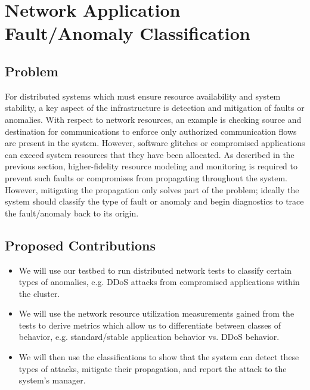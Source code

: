 \section{Network Application Fault/Anomaly Classification}
\label{sec:classification}

\subsection{Problem}
For distributed systems which must ensure resource availability and
system stability, a key aspect of the infrastructure is detection and
mitigation of faults or anomalies.  With respect to network resources,
an example is checking source and destination for communications to
enforce only authorized communication flows are present in the system.
However, software glitches or compromised applications can exceed
system resources that they have been allocated.  As described in the
previous section, higher-fidelity resource modeling and monitoring is
required to prevent such faults or compromises from propagating
throughout the system.  However, mitigating the propagation only
solves part of the problem; ideally the system should classify the
type of fault or anomaly and begin diagnostics to trace the
fault/anomaly back to its origin.

\subsection{Proposed Contributions}
\begin{itemize}
	\item We will use our testbed to run distributed network tests
          to classify certain types of anomalies, e.g. DDoS attacks
          from compromised applications within the cluster.
	\item We will use the network resource utilization
          measurements gained from the tests to derive metrics which
          allow us to differentiate between classes of behavior,
          e.g. standard/stable application behavior vs. DDoS behavior.
	\item We will then use the classifications to show that the
          system can detect these types of attacks, mitigate their
          propagation, and report the attack to the system's manager.
\end{itemize}

\fi
